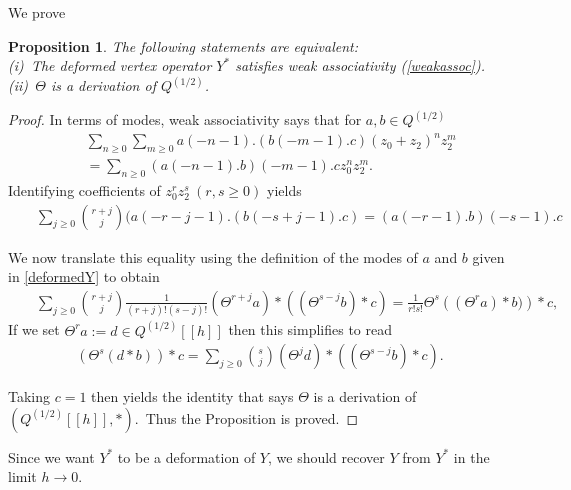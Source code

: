 \documentclass[12pt]{amsart}
\theoremstyle{plain}
\newtheorem{prop}[thm]{Proposition}
\theoremstyle{definition}
\theoremstyle{remark}
\begin{document}
\medskip
We prove
 \begin{prop} The following statements are equivalent:\\
(i)\ The deformed vertex operator $Y^*$  satisfies weak associativity (\ref{weakassoc}).\\
  (ii)\  $\Theta$ is a derivation of $Q^{(1/2)}$.
 \end{prop}
 \begin{proof}
     In terms of modes, weak associativity says that
     for $a, b\in Q^{(1/2)}$
\begin{eqnarray*}
 && \sum_{n\geq0}\sum_{m\geq0} a(-n-1).(b(-m-1).c) (z_0+z_2)^nz_2^m\\
 &&= \sum_{n\geq0} (a(-n-1).b)(-m-1).c z_0^nz_2^m.
\end{eqnarray*}
Identifying coefficients of $z_0^rz_2^s\ (r, s\geq0)$ yields
\begin{eqnarray*}
&& \sum_{j\geq0}\binom{r+j}{j} (a(-r-j-1).(b(-s+j-1).c)= (a(-r-1).b)(-s-1).c
\end{eqnarray*}

\medskip
We now translate this equality using the definition of the modes of $a$ and $b$
given in \eqref{deformedY} to obtain
\begin{eqnarray*}
&&\sum_{j\geq0}\binom{r+j}{j}\frac{1}{(r+j)!(s-j)!} (\Theta^{r+j}a)* ((\Theta^{s-j} b)*c)=\frac{1}{r!s!}\Theta^s\left((\Theta^ra)*b)   \right)*c,
\end{eqnarray*}
If we set $\Theta^ra:= d\in Q^{(1/2)}[[h]]$ then this simplifies to read
\begin{eqnarray*}
  (\Theta^s(d*b))*c= \sum_{j\geq0}
  \binom{s}{j} (\Theta^jd)*((\Theta^{s-j}b)*c).
\end{eqnarray*}

Taking $c=1$ then yields the identity that says $\Theta$ is a derivation of $(Q^{(1/2)}[[h]], *)$.\ Thus the Proposition is proved.
 \end{proof}

 Since we want $Y^*$ to be a deformation of $Y$, we should recover $Y$ from $Y^*$ in the limit $h\rightarrow 0$.
 \fi
\end{document}
